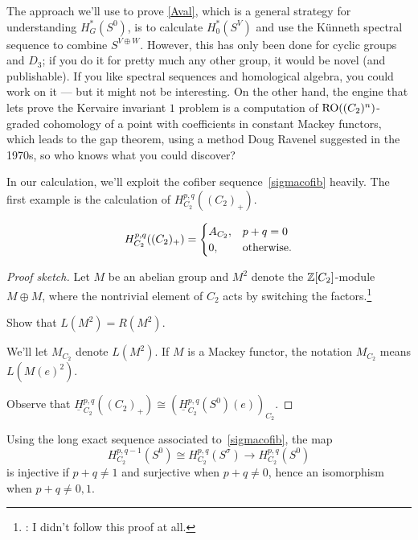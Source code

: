 The approach we'll use to prove \cref{Aval}, which is a general strategy for understanding $H_G^*(S^0)$, is to
calculate $H_0^*(S^V)$ and use the Künneth spectral sequence to combine $S^{V\oplus W}$. However, this has only
been done for cyclic groups and $D_3$; if you do it for pretty much any other group, it would be novel (and
publishable). If you like spectral sequences and homological algebra, you could work on it --- but it might not be
interesting. On the other hand, the engine that lets \cite{HHR} prove the Kervaire invariant $1$ problem is a
computation of $\mathrm{RO}((C_2)^n)$-graded cohomology of a point with coefficients in constant Mackey functors, which
leads to the gap theorem, using a method Doug Ravenel suggested in the 1970s, so who knows what you could discover?

In our calculation, we'll exploit the cofiber sequence~\eqref{sigmacofib} heavily. The first example is the
calculation of $H_{C_2}^{p,q}((C_2)_+)$.
\begin{prop}
\[H_{C_2}^{p,q}((C_2)_+) = \begin{cases}
	A_{C_2}, &p +q = 0\\
	0, &\text{\rm otherwise.}
\end{cases}\]
\end{prop}
\begin{proof}[Proof sketch]
Let $M$ be an abelian group and $M^2$ denote the $\mathbb Z[C_2]$-module $M\oplus M$, where the nontrivial element of
$C_2$ acts by switching the factors.\footnote{\TODO: I didn't follow this proof at all.}
\begin{ex}
Show that $L(M^2) = R(M^2)$.
\end{ex}
We'll let $M_{C_2}$ denote $L(M^2)$. If $M$ is a Mackey functor, the notation $M_{C_2}$ means $L(M(e)^2)$.

Observe that $\underline H_{C_2}^{p,q}((C_2)_+)\cong (\underline H_{C_2}^{p,q}(S^0)(e))_{C_2}$.
\end{proof}
Using the long exact sequence associated to~\eqref{sigmacofib}, the map
\[H_{C_2}^{p,q-1}(S^0)\cong H_{C_2}^{p,q}(S^\sigma)\longrightarrow H_{C_2}^{p,q}(S^0)\]
is injective if $p+q\ne 1$ and surjective when $p+q\ne 0$, hence an isomorphism when $p+q\ne 0,1$.

